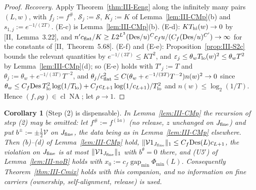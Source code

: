 \documentclass[10pt]{amsart}
\newtheorem{corollary}[theorem]{Corollary}
\theoremstyle{definition}
\theoremstyle{remark}
\newcommand{\NA}{\operatorname{NA}}
\newcommand{\cl}{\operatorname{cl}}
\newcommand{\gap}{\operatorname{gap}}
\begin{document}
\begin{proof}
\emph{Recovery.}  Apply Theorem~\ref{thm:III-Eeng} along the infinitely many
pairs $(L,w)$, with $f_j:=f^\#$, $\mathcal S_j:=\mathcal S$, $K_j:=K$ of
Lemma~\ref{lem:III-CMp}(b) and $s_{1,j}:=e^{-1/(2T)}$.  (E-c) is
Lemma~\ref{lem:III-CMp}(b).  (E-d): $KT_{\rm hi}(w)\to0$ by [II,~Lemma~3.22], and
$n'c_{\rm flat}/K\ge L2^{L^3}(\mathrm{Des}/u)^Cc_fu/(C_f(\mathrm{Des}/u)^{C'})\to
\infty$ for the constants of [II,~Theorem~5.68].  (E-f) and (E-e):
Proposition~\ref{prop:III-S2c} bounds the relevant quantities by $e^{-1/(3T)}\le
KT^2$, and $\varepsilon_j\le\theta_wT_{\rm lo}(w)^2\le\theta_wT^2$ by
Lemma~\ref{lem:III-CMp}(d); so (E-e) holds with $T'_j:=T$ and $\theta_j:=
\theta_w+e^{-1/(3T)}T^{-2}$, and $\theta_j/c_{\rm flat}^2\le C(\theta_w+e^{-1/(3T)}
T^{-2})n(w)^2\to0$
since $\theta_w\le C_f\mathrm{Des}\,T_{\rm lo}^2\log(1/T_{\rm lo})+C_fc_{L+1}
\log(1/c_{L+1})/T_{\rm lo}^2$ and $n(w)\le\log_2(1/T)$.  Hence $(f,\rho g)\in
\cl\NA$; let $\rho\to1$.
\end{proof}

\begin{corollary}[Step (2) is dispensable]\label{cor:III-noB}
In Lemma~\textup{\ref{lem:III-CMp}} the recursion of step \textup{(2)} may be
omitted: let $f^\#:=f^{(1a)}$ \textup{(}no release, $z$ unchanged on $J_{\rm
fine}$\textup{)} and put $b^\pm:=\pm\frac12\mathcal V$ on $J_{\rm fine}$, the data
being as in Lemma~\textup{\ref{lem:III-CMp}} elsewhere.  Then
\textup{(b)}--\textup{(d)} of Lemma~\textup{\ref{lem:III-CMp}} hold,
$\|\mathcal V1_{J_{\rm fine}}\|_1\le C_f\mathrm{Des}(L)c_{L+1}$, the violation
on $J_{\rm fine}$ is at most $\|\mathcal V1_{J_{\rm fine}}\|_1$ with $b^\theta=0$
there, and \textup{(U5$'$)} of Lemma~\textup{\ref{lem:III-noB}} holds with
$x_0:=c_f\gap_{\min}\Phi_{\min}(L)$.  Consequently
Theorem~\textup{\ref{thm:III-Cmix}} holds with this companion, and no
information on fine carriers \textup{(}ownership, self-alignment, release\textup{)}
is used.
\end{corollary}
\end{document}
